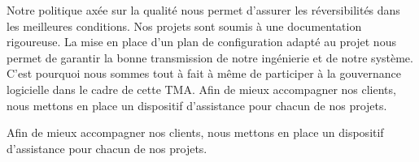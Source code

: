 	Notre politique axée sur la qualité nous permet d’assurer les réversibilités dans les meilleures conditions. Nos projets sont soumis à une documentation rigoureuse. La mise en place d’un plan de configuration adapté au projet nous permet de garantir la bonne transmission de notre ingénierie et de notre système. C’est pourquoi nous sommes tout à fait à même de participer à la gouvernance logicielle dans le cadre de cette TMA.
	Afin de mieux accompagner nos clients, nous mettons en place un dispositif d’assistance pour chacun de nos projets.
	
	Afin de mieux accompagner nos clients, nous mettons en place un dispositif d’assistance pour chacun de nos projets.
	